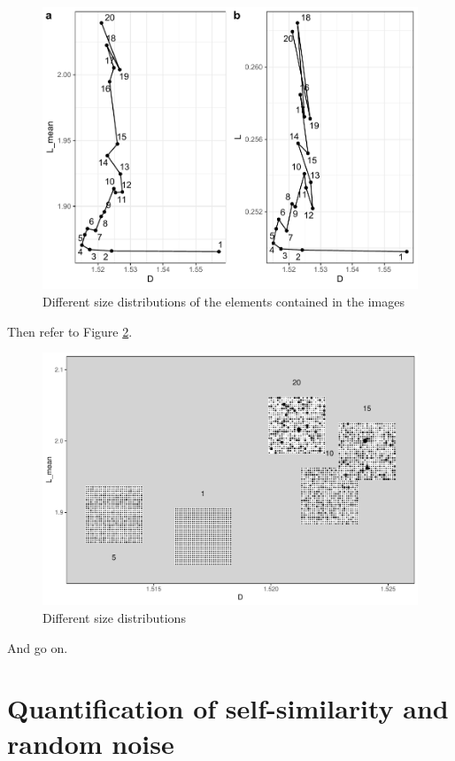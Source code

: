 \documentclass[
  12pt,
]{book}
\begin{document}
\begin{figure}

{\centering \includegraphics[width=0.9\linewidth]{bookdown-demo_files/figure-latex/08-distr-1} 

}

\caption{Different size distributions of the elements contained in the images}\label{fig:08-distr}
\end{figure}

Then refer to Figure \ref{fig:08-distr-im}.

\begin{figure}
\hypertarget{fig:08-distr-im}{%
\centering
\includegraphics{Results/fig08_distr_im.pdf}
\caption{Different size distributions}\label{fig:08-distr-im}
}
\end{figure}

And go on.

\hypertarget{quantification-of-self-similarity-and-random-noise}{%
\section{Quantification of self-similarity and random noise}\label{quantification-of-self-similarity-and-random-noise}}
\end{document}
